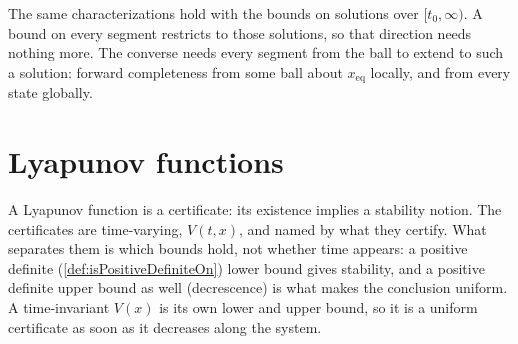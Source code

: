 








The same characterizations hold with the bounds on solutions over $[t_0, \infty)$.  A bound on
every segment restricts to those solutions, so that direction needs nothing more.  The converse
needs every segment from the ball to extend to such a solution: forward completeness from some
ball about $x_{\mathrm{eq}}$ locally, and from every state globally.




\section{Lyapunov functions}

A Lyapunov function is a certificate: its existence implies a stability notion. The certificates
are time-varying, $V(t, x)$, and named by what they certify. What separates them is which bounds
hold, not whether time appears: a positive definite (\cref{def:isPositiveDefiniteOn}) lower bound gives stability, and a
positive definite upper bound as well (decrescence) is what makes the conclusion uniform. A
time-invariant $V(x)$ is its own lower and upper bound, so it is a uniform certificate as soon as
it decreases along the system.

